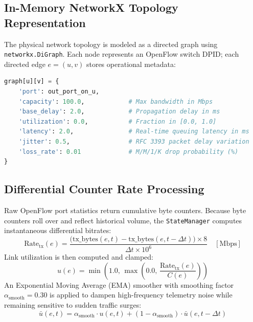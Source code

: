 \documentclass[12pt,a4paper,oneside]{report}
\begin{document}
\subsection{In-Memory NetworkX Topology Representation}
The physical network topology is modeled as a directed graph using \texttt{networkx.DiGraph}. Each node represents an OpenFlow switch DPID; each directed edge $e = (u, v)$ stores operational metadata:
\begin{lstlisting}[language=Python, caption={NetworkX Edge Telemetry Schema in StateManager}]
graph[u][v] = {
    'port': out_port_on_u,
    'capacity': 100.0,            # Max bandwidth in Mbps
    'base_delay': 2.0,            # Propagation delay in ms
    'utilization': 0.0,           # Fraction in [0.0, 1.0]
    'latency': 2.0,               # Real-time queuing latency in ms
    'jitter': 0.5,                # RFC 3393 packet delay variation
    'loss_rate': 0.01             # M/M/1/K drop probability (%)
}
\end{lstlisting}

\subsection{Differential Counter Rate Processing}
Raw OpenFlow port statistics return cumulative byte counters. Because byte counters roll over and reflect historical volume, the \texttt{StateManager} computes instantaneous differential bitrates:
\begin{equation}
    \text{Rate}_{\text{tx}}(e) = \frac{\big(\text{tx\_bytes}(e, t) - \text{tx\_bytes}(e, t - \Delta t)\big) \times 8}{\Delta t \times 10^6} \quad [\text{Mbps}]
\end{equation}
Link utilization is then computed and clamped:
\begin{equation}
    u(e) = \min\left(1.0, \, \max\left(0.0, \, \frac{\text{Rate}_{\text{tx}}(e)}{C(e)}\right)\right)
\end{equation}
An Exponential Moving Average (EMA) smoother with smoothing factor $\alpha_{\text{smooth}} = 0.30$ is applied to dampen high-frequency telemetry noise while remaining sensitive to sudden traffic surges:
\begin{equation}
    \bar{u}(e, t) = \alpha_{\text{smooth}} \cdot u(e, t) + (1 - \alpha_{\text{smooth}}) \cdot \bar{u}(e, t - \Delta t)
\end{equation}
\end{document}
